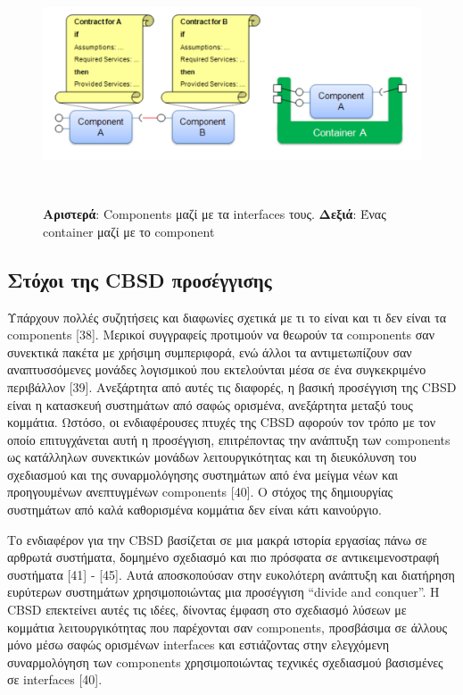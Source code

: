 \begin{figure}[htbp]
	\centering
		\includegraphics[height=7cm,width=15cm]{Figures/8.png}
	\caption{\textbf{Αριστερά}: Components μαζί με τα interfaces τους. \textbf{Δεξιά}: Ένας container μαζί με το component \cite{Panunzio} }	
\end{figure}

\subsection{Στόχοι της CBSD προσέγγισης}

Υπάρχουν πολλές συζητήσεις και διαφωνίες σχετικά με τι το είναι και τι δεν είναι τα components [38]. Μερικοί συγγραφείς προτιμούν να θεωρούν τα components σαν συνεκτικά πακέτα με χρήσιμη συμπεριφορά, ενώ άλλοι τα αντιμετωπίζουν σαν αναπτυσσόμενες μονάδες λογισμικού που εκτελούνται μέσα σε ένα συγκεκριμένο περιβάλλον [39]. Ανεξάρτητα από αυτές τις διαφορές, η βασική προσέγγιση της CBSD είναι η κατασκευή συστημάτων από σαφώς ορισμένα, ανεξάρτητα μεταξύ τους κομμάτια. Ωστόσο, οι ενδιαφέρουσες πτυχές της CBSD αφορούν τον τρόπο με τον οποίο επιτυγχάνεται αυτή η προσέγγιση, επιτρέποντας την ανάπτυξη των components ως κατάλληλων συνεκτικών μονάδων λειτουργικότητας και τη διευκόλυνση του σχεδιασμού και της συναρμολόγησης συστημάτων από ένα μείγμα νέων και προηγουμένων ανεπτυγμένων components [40]. Ο στόχος της δημιουργίας συστημάτων από καλά καθορισμένα κομμάτια δεν είναι κάτι καινούργιο. 

	Το ενδιαφέρον για την CBSD βασίζεται σε μια μακρά ιστορία εργασίας πάνω σε αρθρωτά συστήματα, δομημένο σχεδιασμό και πιο πρόσφατα σε αντικειμενοστραφή συστήματα [41] - [45]. Αυτά αποσκοπούσαν στην ευκολότερη ανάπτυξη και διατήρηση ευρύτερων συστημάτων χρησιμοποιώντας μια προσέγγιση “divide and conquer”. Η CBSD επεκτείνει αυτές τις ιδέες, δίνοντας έμφαση στο σχεδιασμό λύσεων με κομμάτια λειτουργικότητας που παρέχονται σαν components, προσβάσιμα σε άλλους μόνο μέσω σαφώς ορισμένων interfaces και εστιάζοντας στην ελεγχόμενη συναρμολόγηση των components χρησιμοποιώντας τεχνικές σχεδιασμού βασισμένες σε interfaces [40].


